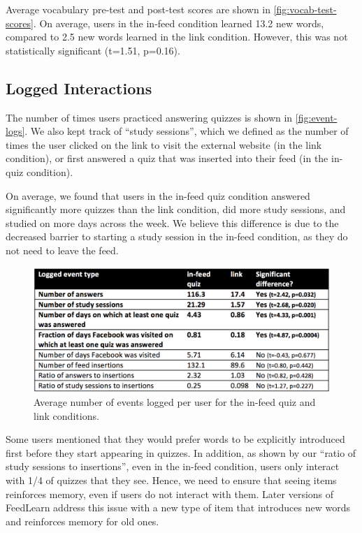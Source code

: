 \documentclass{chi-ext}
\begin{document}
Average vocabulary pre-test and post-test scores are shown in \autoref{fig:vocab-test-scores}. On average, users in the in-feed condition learned 13.2 new words, compared to 2.5 new words learned in the link condition. However, this was not statistically significant (t=1.51, p=0.16).

\subsection{Logged Interactions}

The number of times users practiced answering quizzes is shown in \autoref{fig:event-logs}. We also kept track of ``study sessions'', which we defined as the number of times the user clicked on the link to visit the external website (in the link condition), or first answered a quiz that was inserted into their feed (in the in-quiz condition). %

On average, we found that users in the in-feed quiz condition answered significantly more quizzes than the link condition, did more study sessions, and studied on more days across the week. We believe this difference is due to the decreased barrier to starting a study session in the in-feed condition, as they do not need to leave the feed.

\begin{figure}
\centering
\includegraphics[width=1.0\columnwidth]{event-logs-feedlearn}
\caption{Average number of events logged per user for the in-feed quiz and link conditions.}
\label{fig:event-logs}
\end{figure}


Some users mentioned that they would prefer words to be explicitly introduced first before they start appearing in quizzes.  In addition, as shown by our ``ratio of study sessions to insertions'', even in the in-feed condition, users only interact with 1/4 of quizzes that they see. Hence, we need to ensure that seeing items reinforces memory, even if users do not interact with them. Later versions of FeedLearn address this issue with a new type of item that introduces new words and reinforces memory for old ones.
\end{document}
